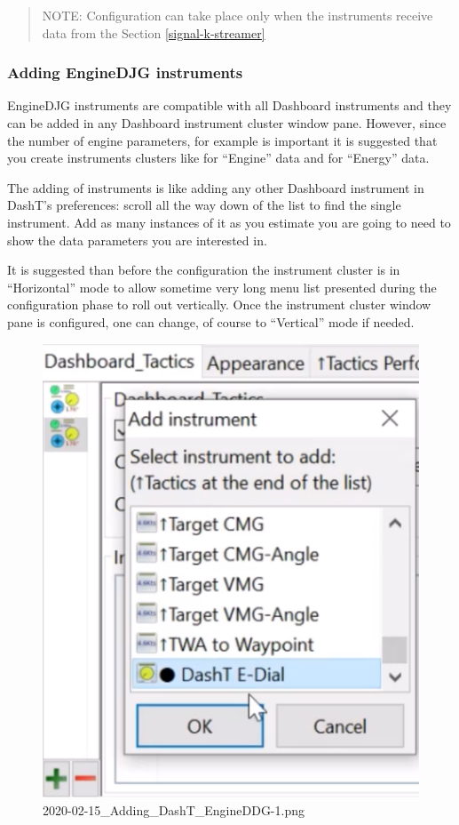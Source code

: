 \documentclass[11pt]{article}
\begin{document}
    \begin{quote}
NOTE: Configuration can take place only when the instruments receive
data from the Section \ref{signal-k-streamer}
\end{quote}

    \hypertarget{adding-enginedjg-instruments}{%
\subsubsection{Adding EngineDJG
instruments}\label{adding-enginedjg-instruments}}

    EngineDJG instruments are compatible with all Dashboard instruments and
they can be added in any Dashboard instrument cluster window pane.
However, since the number of engine parameters, for example is important
it is suggested that you create instruments clusters like for ``Engine''
data and for ``Energy'' data.

    The adding of instruments is like adding any other Dashboard instrument
in DashT's preferences: scroll all the way down of the list to find the
single instrument. Add as many instances of it as you estimate you are
going to need to show the data parameters you are interested in.

    It is suggested than before the configuration the instrument cluster is
in ``Horizontal'' mode to allow sometime very long menu list presented
during the configuration phase to roll out vertically. Once the
instrument cluster window pane is configured, one can change, of course
to ``Vertical'' mode if needed.

    \begin{figure}
\centering
\includegraphics{2020-02-15_Adding_DashT_EngineDDG-1.png}
\caption{2020-02-15\_Adding\_DashT\_EngineDDG-1.png}
\end{figure}
\end{document}
